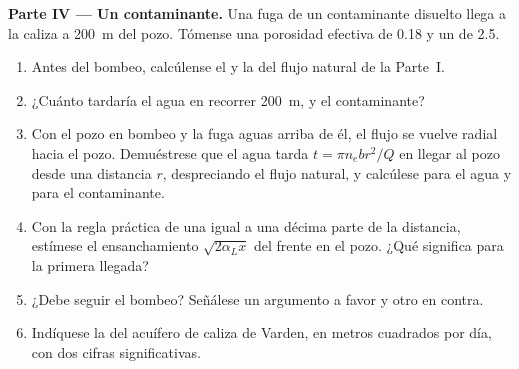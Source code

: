 \begin{problem}
\medskip\noindent\textbf{Parte IV --- Un contaminante.} Una fuga de un contaminante disuelto
llega a la caliza a \qty{200}{m} del pozo. Tómense
una porosidad efectiva de 0.18 y un  de 2.5.
\begin{enumerate}[resume]
\item Antes del bombeo, calcúlense el  y la 
  del flujo natural de la Parte~I.
\item ¿Cuánto tardaría el agua en recorrer \qty{200}{m}, y el
  contaminante?
\item Con el pozo en bombeo y la fuga aguas arriba de él, el flujo
  se vuelve radial hacia el pozo. Demuéstrese que el agua tarda $t = \pi n_e b
  r^2/Q$ en llegar al pozo desde una distancia $r$, despreciando el flujo
  natural, y calcúlese para el agua y para el contaminante.
\item Con la regla práctica de una  igual a una décima parte de la distancia,
  estímese el ensanchamiento $\sqrt{2\alpha_Lx}$ del frente en el pozo. ¿Qué
  significa para la primera llegada?
\item ¿Debe seguir el bombeo? Señálese un argumento a favor y otro en contra.
\item Indíquese la  del acuífero de caliza de Varden, en metros cuadrados por día,
  con dos cifras significativas.
\end{enumerate}
\end{problem}
